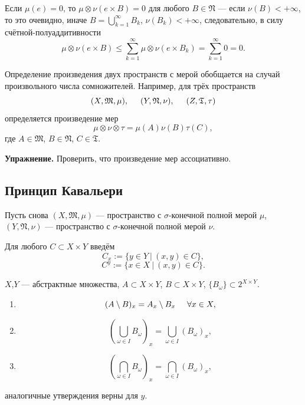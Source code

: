 \begin{remark}
    Если $\mu(e)=0$, то $\mu \otimes \nu(e \times B) = 0$ для любого $B \in \mathfrak{N}$ — если $\nu(B) < +\infty$, то это очевидно, иначе $B = \bigcup\limits_{k=1}^{\infty} B_k$, $\nu(B_k) < +\infty$, следовательно, в силу счётной-полуаддитивности
    \[\mu \otimes \nu(e \times B) \leqslant \sum\limits_{k=1}^{\infty} \mu \otimes \nu(e \times B_k) = \sum\limits_{k=1}^{\infty} 0 = 0.\]
\end{remark}

Определение произведения двух пространств с мерой обобщается на случай произвольного числа сомножителей.
Например, для трёх пространств
\[(X, \mathfrak{M}, \mu), \hspace*{.5cm} (Y, \mathfrak{N}, \nu), \hspace*{.5cm} (Z, \mathfrak{T}, \tau)\]
определяется произведение мер
\[\mu \otimes \nu \otimes \tau = \mu(A) \nu(B) \tau(C),\]
где $A \in \mathfrak{M}$, $B \in \mathfrak{N}$, $C \in \mathfrak{T}$.

\noindent\textbf{Упражнение.} Проверить, что произведение мер ассоциативно.

\subsection{Принцип Кавальери}
Пусть снова
$(X, \mathfrak{M}, \mu)$ — пространство с $\sigma$-конечной полной мерой $\mu$, $(Y, \mathfrak{N}, \nu)$ — пространство с $\sigma$-конечной полной мерой $\nu$.

Для любого $C \subset X \times Y$ введём
\[C_x := \{y \in Y \ | \ (x,y) \in C\},\]
\[C^y := \{x \in X \ | \ (x,y) \in C\}.\]

\begin{lemma}
    $X$,$Y$ — абстрактные множества, $A \subset X \times Y$, $B \subset X \times Y$, $\{B_\omega\} \subset 2^{X \times Y}$.
    \begin{enumerate}
        \item \[(A \setminus B)_x = A_x \setminus B_x \hspace*{.5cm} \forall x \in X,\]
        \item \[\left(\bigcup\limits_{\omega \in I}B_\omega\right)_x = \bigcup\limits_{\omega \in I}(B_\omega)_x,\]
        \item \[\left(\bigcap\limits_{\omega \in I}B_\omega\right)_x = \bigcap\limits_{\omega \in I} (B_\omega)_x,\]
    \end{enumerate}
    аналогичные утверждения верны для $y$.
\end{lemma} 

